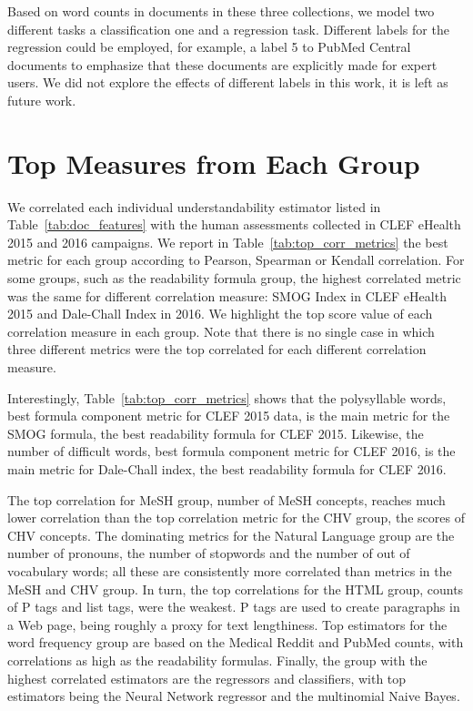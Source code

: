 \documentclass[runningheads,a4paper]{llncs}
\begin{document}
Based on word counts in documents in these three collections, we model two different tasks a classification one and a regression task.
Different labels for the regression could be employed, for example, a label 5 to PubMed Central documents to emphasize that these documents are explicitly made for expert users.
We did not explore the effects of different labels in this work, it is left as future work.



\section{Top Measures from Each Group}
\label{sec:beyond_readability}

We correlated each individual understandability estimator listed in Table~\ref{tab:doc_features} with the human assessments collected in CLEF eHealth 2015 and 2016 campaigns.
We report in Table~\ref{tab:top_corr_metrics} the best metric for each group according to Pearson, Spearman or Kendall correlation.
For some groups, such as the readability formula group, the highest correlated metric was the same for different correlation measure: SMOG Index in CLEF eHealth 2015 and Dale-Chall Index in 2016. 
We highlight the top score value of each correlation measure in each group. Note that there is no single case in which three different metrics were the top correlated for each different correlation measure.

Interestingly, Table~\ref{tab:top_corr_metrics} shows that the polysyllable words, best formula component metric for CLEF 2015 data, is the main metric for the SMOG formula, the best readability formula for CLEF 2015. 
Likewise, the number of difficult words, best formula component metric for CLEF 2016, is the main metric for Dale-Chall index, the best readability formula for CLEF 2016.

The top correlation for MeSH group, number of MeSH concepts, reaches much lower correlation than the top correlation metric for the CHV group, the scores of CHV concepts.
The dominating metrics for the Natural Language group are the number of pronouns, the number of stopwords and the number of out of vocabulary words; all these are consistently more correlated than metrics in the MeSH and CHV group.
In turn, the top correlations for the HTML group, counts of P tags and list tags, were the weakest. P tags are used to create paragraphs in a Web page, being roughly a proxy for text lengthiness. 
Top estimators for the word frequency group are based on the Medical Reddit and PubMed counts, with correlations as high as the readability formulas.
Finally, the group with the highest correlated estimators are the regressors and classifiers, with top estimators being the Neural Network regressor and the multinomial Naive Bayes.
%

%
\end{document}

